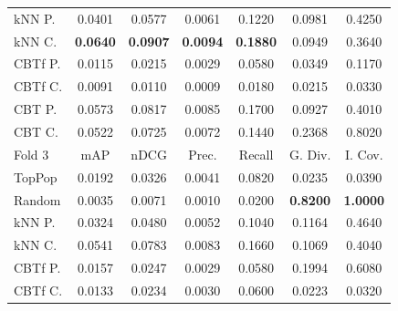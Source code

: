 \begin{table}[hbt]
\begin{tabulary}{\textwidth}{|L|CCCCCC|}
kNN P. & 0.0401 &           0.0577 &           0.0061 &           0.1220 &                                            0.0981 &                                            0.4250 \\
kNN C. & \textbf{0.0640} &  \textbf{0.0907} &  \textbf{0.0094} &  \textbf{0.1880} &                                            0.0949 &                                            0.3640 \\
CBTf P. & 0.0115 &           0.0215 &           0.0029 &           0.0580 &                                            0.0349 &                                            0.1170 \\
CBTf C. & 0.0091 &           0.0110 &           0.0009 &           0.0180 &                                            0.0215 &                                            0.0330 \\
CBT P. & 0.0573 &           0.0817 &           0.0085 &           0.1700 &                                            0.0927 &                                            0.4010 \\
CBT C. & 0.0522 &           0.0725 &           0.0072 &           0.1440 &                                            0.2368 &                                            0.8020 \\
\hline
\hline
Fold 3 & mAP & nDCG & Prec. & Recall & G. Div. & I. Cov. \\
\hline
TopPop & 0.0192 &           0.0326 &           0.0041 &           0.0820 &                                            0.0235 &                                            0.0390 \\
Random & 0.0035 &           0.0071 &           0.0010 &           0.0200 &                                   \textbf{0.8200} &                                   \textbf{1.0000} \\
kNN P. & 0.0324 &           0.0480 &           0.0052 &           0.1040 &                                            0.1164 &                                            0.4640 \\
kNN C. & 0.0541 &           0.0783 &           0.0083 &           0.1660 &                                            0.1069 &                                            0.4040 \\
CBTf P. & 0.0157 &           0.0247 &           0.0029 &           0.0580 &                                            0.1994 &                                            0.6080 \\
CBTf C. & 0.0133 &           0.0234 &           0.0030 &           0.0600 &                                            0.0223 &                                            0.0320 \\

\end{tabulary}
\end{table}
